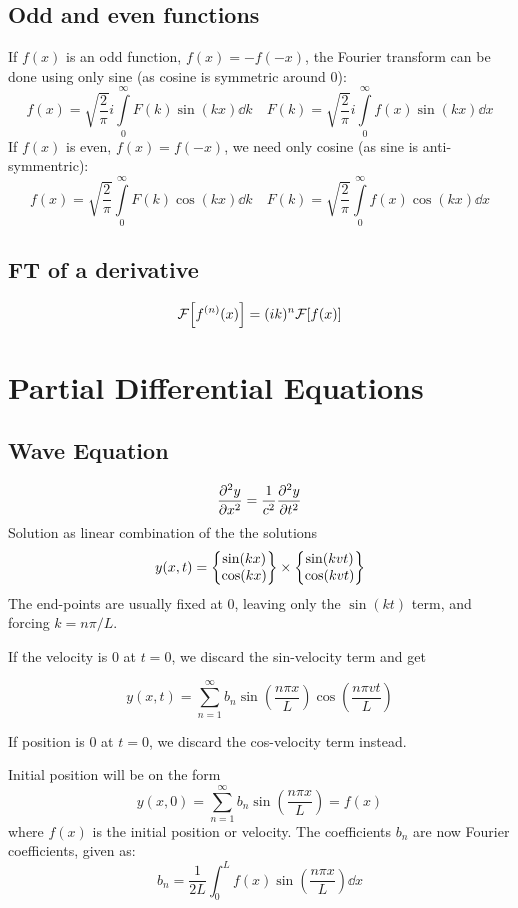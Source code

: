\documentclass[10pt,a4paper]{article}
\newcommand{\oneinfsum}{\sum_{n=1}^{\infty}}
\begin{document}
\begin{multicols}{2}
\subsection*{Odd and even functions}
If $f(x)$ is an odd function, $f(x) = -f(-x)$, the Fourier transform can be done using only sine (as cosine is symmetric around 0):
\[
    f(x) = \sqrt{\frac{2}{\pi}} i\int\limits_0^{\infty} F(k) \sin(k x) \dd{k}   \quad
    F(k) = \sqrt{\frac{2}{\pi}} i\int\limits_0^{\infty} f(x) \sin(k x) \dd{x}
\]
If $f(x)$ is even, $f(x) = f(-x)$, we need only cosine (as sine is anti-symmentric):
\[
    f(x) = \sqrt{\frac{2}{\pi}} \int\limits_0^{\infty} F(k) \cos(k x) \dd{k}   \quad
    F(k) = \sqrt{\frac{2}{\pi}} \int\limits_0^{\infty} f(x) \cos(k x) \dd{x}
\]


\subsection*{FT of a derivative}
\[
    \mathcal{F}\qty[f^{(n)}(x)] = (ik)^n \mathcal{F}\qty[f(x)]
\]

\newpage


\section*{Partial Differential Equations}
\subsection*{Wave Equation}
\[
    \pdv[2]{y}{x} = \frac{1}{c^2}\pdv[2]{y}{t}
\]
Solution as linear combination of the the solutions
\[
    y(x,t) = \qty{\begin{matrix} \sin(kx) \\ \cos(kx) \end{matrix}} \times \qty{\begin{matrix} \sin(kvt) \\ \cos(kvt) \end{matrix}}
\]
The end-points are usually fixed at 0, leaving only the $\sin(kt)$ term, and forcing $k=n\pi/L$.

If the velocity is 0 at $t=0$, we discard the sin-velocity term and get

\[
    y(x,t) = \oneinfsum b_n\sin(\frac{n\pi x}{L})\cos(\frac{n\pi v t}{L})
\]

If position is 0 at $t=0$, we discard the cos-velocity term instead.

Initial position will be on the form
\[
    y(x,0) = \oneinfsum b_n \sin(\frac{n\pi x}{L}) = f(x)
\]
where $f(x)$ is the initial position or velocity. The coefficients $b_n$ are now Fourier coefficients, given as:
\[
    b_n = \frac{1}{2L}\int_{0}^{L} f(x)\sin(\frac{n\pi x}{L}) \dd{x}
\]

\newpage





\end{multicols}
\end{document}
